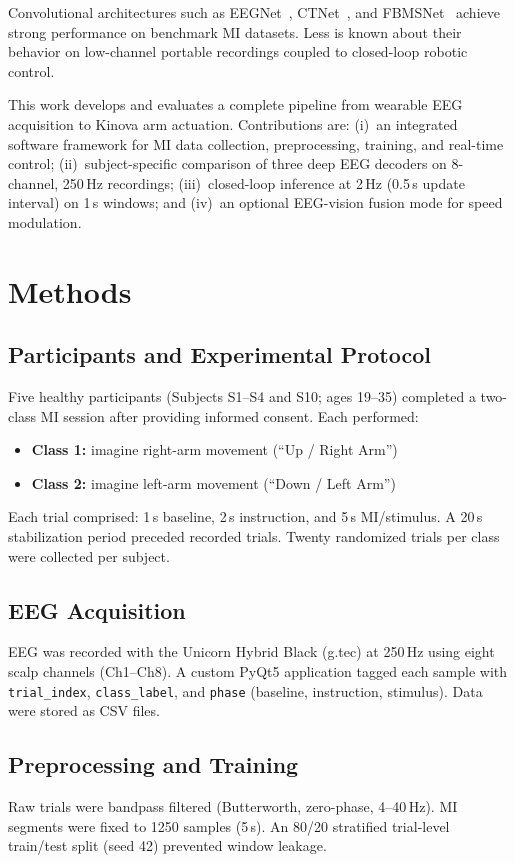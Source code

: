 \documentclass[conference]{IEEEtran}
\begin{document}
Convolutional architectures such as EEGNet~\cite{lawhern2018}, CTNet~\cite{ctnet2023}, and FBMSNet~\cite{fbmsnet2022} achieve strong performance on benchmark MI datasets. Less is known about their behavior on low-channel portable recordings coupled to closed-loop robotic control.

This work develops and evaluates a complete pipeline from wearable EEG acquisition to Kinova arm actuation. Contributions are: (i)~an integrated software framework for MI data collection, preprocessing, training, and real-time control; (ii)~subject-specific comparison of three deep EEG decoders on 8-channel, 250\,Hz recordings; (iii)~closed-loop inference at 2\,Hz (0.5\,s update interval) on 1\,s windows; and (iv)~an optional EEG-vision fusion mode for speed modulation.

\section{Methods}

\subsection{Participants and Experimental Protocol}
Five healthy participants (Subjects S1--S4 and S10; ages 19--35) completed a two-class MI session after providing informed consent. Each performed:
\begin{itemize}
    \item \textbf{Class 1:} imagine right-arm movement (``Up / Right Arm'')
    \item \textbf{Class 2:} imagine left-arm movement (``Down / Left Arm'')
\end{itemize}
Each trial comprised: 1\,s baseline, 2\,s instruction, and 5\,s MI/stimulus. A 20\,s stabilization period preceded recorded trials. Twenty randomized trials per class were collected per subject.

\subsection{EEG Acquisition}
EEG was recorded with the Unicorn Hybrid Black (g.tec) at 250\,Hz using eight scalp channels (Ch1--Ch8). A custom PyQt5 application tagged each sample with \texttt{trial\_index}, \texttt{class\_label}, and \texttt{phase} (baseline, instruction, stimulus). Data were stored as CSV files.

\subsection{Preprocessing and Training}
Raw trials were bandpass filtered (Butterworth, zero-phase, 4--40\,Hz). MI segments were fixed to 1250 samples (5\,s). An 80/20 stratified trial-level train/test split (seed 42) prevented window leakage.
\end{document}
